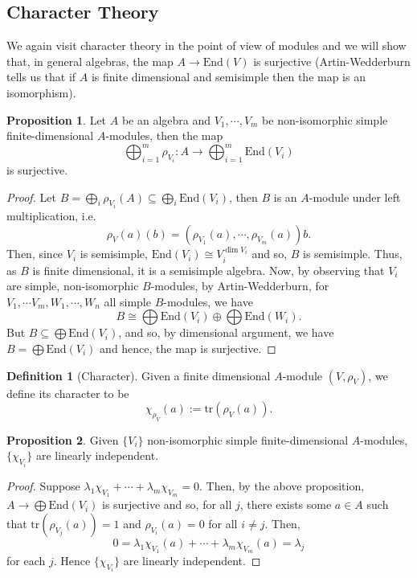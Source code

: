 \documentclass[]{article}
\theoremstyle{definition}
\theoremstyle{definition}
\newtheorem{definition}{Definition}[section]
\newtheorem{proposition}{Proposition}[section]
\begin{document}
\subsection{Character Theory}

We again visit character theory in the point of view of modules and we will 
show that, in general algebras, the map \(A \to \text{End}(V)\) is surjective 
(Artin-Wedderburn tells us that if \(A\) is finite dimensional and semisimple 
then the map is an isomorphism).

\begin{proposition}
  Let \(A\) be an algebra and \(V_1, \cdots, V_m\) be non-isomorphic simple 
  finite-dimensional \(A\)-modules, then the map
  \[\bigoplus_{i = 1}^m \rho_{V_i} : A \to \bigoplus_{i = 1}^m \text{End}(V_i)\] 
  is surjective.
\end{proposition}
\begin{proof}
  Let \(B = \bigoplus_i \rho_{V_i}(A) \subseteq \bigoplus_i \text{End}(V_i)\), 
  then \(B\) is an \(A\)-module under left multiplication, i.e.
  \[\rho_V(a)(b) = (\rho_{V_1}(a), \cdots, \rho_{V_m}(a))b.\]
  Then, since \(V_i\) is semisimple, \(\text{End}(V_i) \cong V_i^{\dim V_i}\) 
  and so, \(B\) is semisimple. Thus, as \(B\) is finite dimensional, it 
  is a semisimple algebra. Now, by observing that \(V_i\) are simple, non-isomorphic 
  \(B\)-modules, by Artin-Wedderburn, for \(V_1, \cdots V_m, W_1, \cdots, W_n\)
  all simple \(B\)-modules, we have 
  \[B \cong \bigoplus \text{End}(V_i) \oplus \bigoplus \text{End}(W_i).\]
  But \(B \subseteq \bigoplus \text{End}(V_i)\), and so, by dimensional 
  argument, we have \(B = \bigoplus \text{End}(V_i)\) and hence, the map is 
  surjective.
\end{proof}

\begin{definition}[Character]
  Given a finite dimensional \(A\)-module \((V, \rho_V)\), we define its 
  character to be 
  \[\chi_{\rho_V}(a) := \text{tr}(\rho_V(a)).\]
\end{definition}

\begin{proposition}
  Given \(\{V_i\}\) non-isomorphic simple finite-dimensional \(A\)-modules,
  \(\{\chi_{V_i}\}\) are linearly independent.
\end{proposition}
\begin{proof}
  Suppose \(\lambda_1 \chi_{V_1} + \cdots + \lambda_m \chi_{V_m} = 0\). Then, 
  by the above proposition, \(A \to \bigoplus \text{End}(V_i)\) is surjective and 
  so, for all \(j\), there exists some \(a \in A\) such that 
  \(\text{tr}(\rho_{V_j}(a)) = 1\) and \(\rho_{V_i}(a) = 0\) for all \(i \neq j\).
  Then, 
  \[0 = \lambda_1 \chi_{V_1}(a) + \cdots + \lambda_m \chi_{V_m}(a) = \lambda_j\]
  for each \(j\). Hence \(\{\chi_{V_i}\}\) are linearly independent.
\end{proof}
\end{document}
